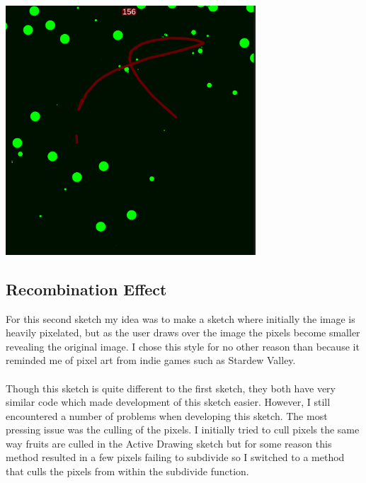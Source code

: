 \documentclass[12pt,a4paper]{article}
\begin{document}
			\begin{center}
				\includegraphics[width=0.7\textwidth]{ADFinal.png}
			\end{center}
		
		\newpage

		\subsection{Recombination Effect}
			For this second sketch my idea was to make a sketch where initially the image is heavily 
			pixelated, but as the user draws over the image the pixels become smaller revealing the 
			original image. I chose this style for no other reason than because it reminded me of pixel
			art from indie games such as Stardew Valley.\\\\Though this sketch is quite different to the 
			first sketch, they both have very similar code which made development of this sketch easier.
			However, I still encountered a number of problems when developing this sketch. The most 
			pressing issue was the culling of the pixels. I initially tried to cull pixels the same 
			way fruits are culled in the Active Drawing sketch but for some reason this method resulted 
			in a few pixels failing to subdivide so I switched to a method that culls the pixels from 
			within the subdivide function.\\
\end{document}
